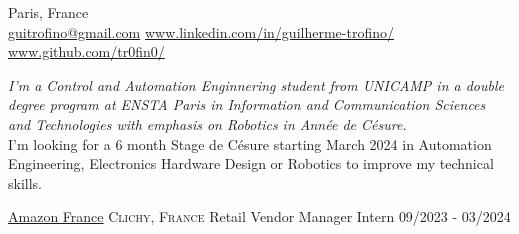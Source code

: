 \documentclass[10pt, a4paper]{article}
\begin{document}
 



 Paris, France\\         %
\href{mailto:guitrofino@gmail.com}{guitrofino@gmail.com}\bull   %
\href{https://www.linkedin.com/in/guilherme-trofino/}{www.linkedin.com/in/guilherme-trofino/}\bull %
\href{https://github.com/tr0fin0}{www.github.com/tr0fin0/}       %

\spacedhrule{0.9em}{-0.4em}



\begin{multicols}{2}
\noindent \textit{I'm a Control and Automation Enginnering student from UNICAMP in a double degree program at ENSTA Paris in Information and Communication Sciences and Technologies with emphasis on Robotics in Année de Césure.}\\
\noindent I'm looking for a 6 month Stage de Césure starting March 2024 in Automation Engineering, Electronics Hardware Design or Robotics to improve my technical skills.
\end{multicols}

\spacedhrule{0.5em}{-0.4em}



\headedsection
    {\href{https://www.aboutamazon.fr/}{Amazon France}}
    {\textsc{Clichy, France}}
    {
        \headedsubsection
        {Retail Vendor Manager Intern}
        {09/2023 - 03/2024}
        {}
    }
\end{document}
